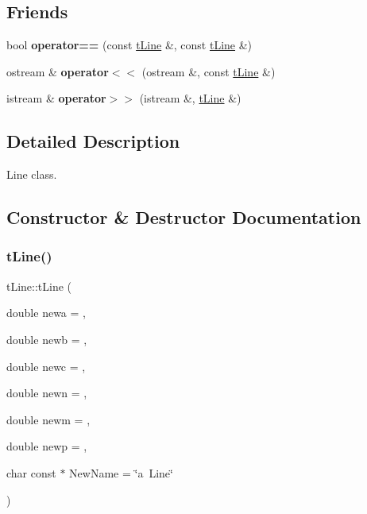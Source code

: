 \subsection*{Friends}
\begin{DoxyCompactItemize}
\item 
\mbox{\label{classtLine_a39d9dbc55c19c2857c4d8fee4d25c667}} 
bool {\bfseries operator==} (const \hyperlink{classtLine}{t\+Line} \&, const \hyperlink{classtLine}{t\+Line} \&)
\item 
\mbox{\label{classtLine_a74399479e67eadce300f996b6ddf21c3}} 
ostream \& {\bfseries operator$<$$<$} (ostream \&, const \hyperlink{classtLine}{t\+Line} \&)
\item 
\mbox{\label{classtLine_a0f6f0d2af6275b58e63e6f5667bf587f}} 
istream \& {\bfseries operator$>$$>$} (istream \&, \hyperlink{classtLine}{t\+Line} \&)
\end{DoxyCompactItemize}


\subsection{Detailed Description}
Line class. 

\subsection{Constructor \& Destructor Documentation}
\mbox{\label{classtLine_ab61e326194db410630307c04cbbaf301}} 
\subsubsection{\texorpdfstring{t\+Line()}{tLine()}}
{\footnotesize\ttfamily t\+Line\+::t\+Line (\begin{DoxyParamCaption}\item[{double}]{newa = {},  }\item[{double}]{newb = {},  }\item[{double}]{newc = {},  }\item[{double}]{newn = {},  }\item[{double}]{newm = {},  }\item[{double}]{newp = {},  }\item[{char const $\ast$}]{New\+Name = {\ttfamily \char`\"{}a~Line\char`\"{}} }\end{DoxyParamCaption})}



